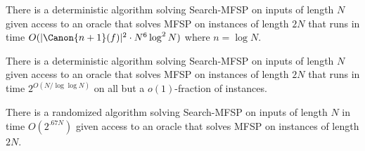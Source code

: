 \begin{statementtheorem}
There is a deterministic algorithm solving Search-MFSP on inputs of length $N$ given access to an oracle that solves MFSP on instances of length $2N$ that runs in time $O(|\Canon{n+1}(f)|^2\cdot N^6\log^2N)$ where $n=\log N$.
\end{statementtheorem}
\begin{statementtheorem}
There is a deterministic algorithm solving Search-MFSP on inputs of length $N$ given access to an oracle that solves MFSP on instances of length $2N$ that runs in time $2^{O(N/\log\log N)}$ on all but a $o(1)$-fraction of instances.
\end{statementtheorem}
\begin{statementtheorem}
There is a randomized algorithm solving Search-MFSP on inputs of length $N$ in time $O(2^{.67N})$ given access to an oracle that solves MFSP on instances of length $2N$.
\end{statementtheorem}
